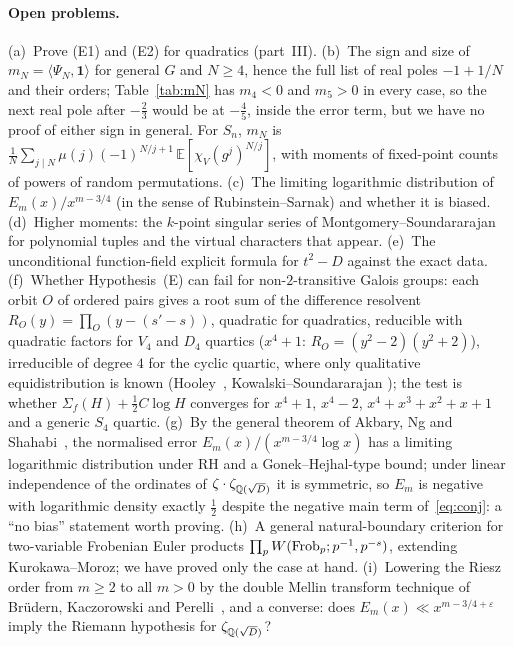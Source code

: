 \documentclass[11pt,a4paper]{article}
\theoremstyle{remark}\newtheorem{remark}[theorem]{Remark}
\begin{document}
\paragraph{Open problems.} (a)~Prove (E1) and (E2) for quadratics (part~III). (b)~The sign and size of $m_N=\langle\Psi_N,\mathbf 1\rangle$ for general $G$ and $N\ge4$, hence the full list of
real poles $-1+1/N$ and their orders; Table~\ref{tab:mN} has $m_4<0$ and $m_5>0$ in every case, so the next real pole
after $-\tfrac23$ would be at $-\tfrac45$, inside the error term, but we have no proof of either sign in general. For $S_n$, $m_N$ is
$\tfrac1N\sum_{j\mid N}\mu(j)(-1)^{N/j+1}\,\mathbb E[\chi_V(g^j)^{N/j}]$, with moments of fixed-point counts of powers
of random permutations. (c)~The limiting logarithmic distribution of $E_m(x)/x^{m-3/4}$ (in the sense of
Rubinstein--Sarnak) and whether it is biased. (d)~Higher moments: the $k$-point singular series of
Montgomery--Soundararajan for polynomial tuples and the virtual characters that appear. (e)~The unconditional
function-field explicit formula for $t^2-D$ against the exact data. (f)~Whether Hypothesis~(E) can fail for
non-$2$-transitive Galois groups: each orbit $O$ of ordered pairs gives a root sum of the difference resolvent
$R_O(y)=\prod_O(y-(s'-s))$, quadratic for quadratics, reducible with quadratic factors for $V_4$ and $D_4$
quartics ($x^4+1$: $R_O=(y^2-2)(y^2+2)$), irreducible of degree $4$ for the cyclic quartic, where only
qualitative equidistribution is known (Hooley~\cite{Hooley1964}, Kowalski--Soundararajan
\cite{KowalskiSoundararajan2021}); the test is whether $\Sigma_f(H)+\tfrac12C\log H$ converges for
$x^4+1$, $x^4-2$, $x^4+x^3+x^2+x+1$ and a generic $S_4$ quartic. (g)~By the general theorem of Akbary, Ng and
Shahabi~\cite{AkbaryNgShahabi2014}, the normalised error $E_m(x)/(x^{m-3/4}\log x)$ has a limiting logarithmic
distribution under RH and a Gonek--Hejhal-type bound; under linear independence of the ordinates of
$\zeta\cdot\zeta_{\mathbb{Q}(\sqrt D)}$ it is symmetric, so $E_m$ is negative with logarithmic density exactly $\tfrac12$
despite the negative main term of~\eqref{eq:conj}: a ``no bias'' statement worth proving. (h)~A general natural-boundary
criterion for two-variable Frobenian Euler products $\prod_pW(\operatorname{Frob}_p;p^{-1},p^{-s})$, extending
Kurokawa--Moroz; we have proved only the case at hand. (i)~Lowering the
Riesz order from $m\ge2$ to all $m>0$ by the double Mellin transform technique of Br\"udern, Kaczorowski and
Perelli~\cite{BrudernKaczorowskiPerelli2019}, and a converse: does $E_m(x)\ll x^{m-3/4+\varepsilon}$ imply the
Riemann hypothesis for $\zeta_{\mathbb{Q}(\sqrt D)}$?
\end{document}
